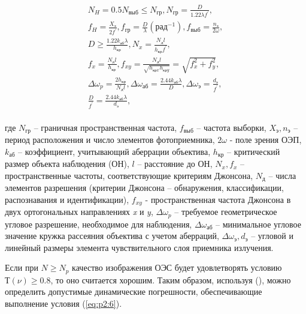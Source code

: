 \begin{equation}
\label{eq:p2:8}
\begin{alignedat}{2}
N_H=0.5 N_{\textit{выб}}\leq{}N_{\textit{гр}},
N_{\textit{гр}}=\frac{D}{1.22\lambda{}f^{'}},\\
f_H=\frac{X_\textit{э}}{2f^{'}},
f_{\textit{гр}}=\frac{D}{\lambda{}}(\textit{рад}^{-1}),
f_{\textit{выб}}=\frac{n_{\textit{э}}}{2\omega{}},\\
D\geq{}\frac{1.22 k_{\textit{аб}}\lambda{}}{h_{\textit{кр}}},
N_x=\frac{N_{\textit{д}}l}{h_{\textit{кр}}f^{'}},\\
f_x=\frac{N_{\textit{д}}l}{h_{\textit{кр}}},
f_{xy}=\frac{N_{\textit{д}}l}{\sqrt{h_{\textit{крx}}h_{\textit{крy}}}}=\sqrt{f_x^2+f_y^2},\\
\Delta{}{\omega{}}_p=\frac{2h_{\textit{кр}}}{N_{\textit{д}}l},
\Delta{}{\omega{}}_{\textit{аб}} =\frac{2.44 k_{\textit{аб}}\lambda{}}{D},
\Delta{}{\omega{}}_{\textit{э}} =\frac{d_{\textit{э}}}{f^{'}},\\
\frac{D}{f^{'}}=\frac{2.44 k_{\textit{аб}}\lambda{}}{d_{\textit{э}}},\\
\end{alignedat}
\end{equation}

где 
$N_{\textit{гр}}$ – граничная пространственная частота, 
$f_{\textit{выб}}$ – частота выборки, 
$X_{\textit{э}} ,n_{\textit{э}}$ –период расположения и число элементов фотоприемника, 
$2\omega$ - поле зрения ОЭП, 
$k_{\textit{аб}}$ – коэффициент, учитывающий аберрации объектива, 
$h_{\textit{кр}}$ – критический размер объекта наблюдения (ОН), 
$l$ – расстояние до ОН, 
$N_{x} , f_{x}$ – пространственные частоты, соответствующие критериям Джонсона, 
$N_{\textit{д}}$ – числа элементов разрешения (критерии Джонсона – обнаружения, классификации, распознавания и идентификации), 
$f_{xy}$ - пространственная частота Джонсона в двух ортогональных направлениях \textit{x} и \textit{y}, 
$\Delta{}{\omega{}}_p$ – требуемое геометрическое угловое разрешение, необходимое для наблюдения, 
$\Delta{}{\omega{}}_{\textit{аб}}$ – минимальное угловое значение кружка рассеяния объектива с учетом аберраций, 
$\Delta{}{\omega{}}_{\textit{э}} , d_{\textit{э}}$ – угловой и линейный размеры элемента чувствительного слоя приемника излучения. 

Если при $N \ge N_p$ качество изображения ОЭС будет удовлетворять условию $Т(\nu) \ge 0.8$, то оно считается хорошим. Таким образом, используя (), можно определить допустимые динамические погрешности, обеспечивающие выполнение условия (\ref{eq:p2:6}).


